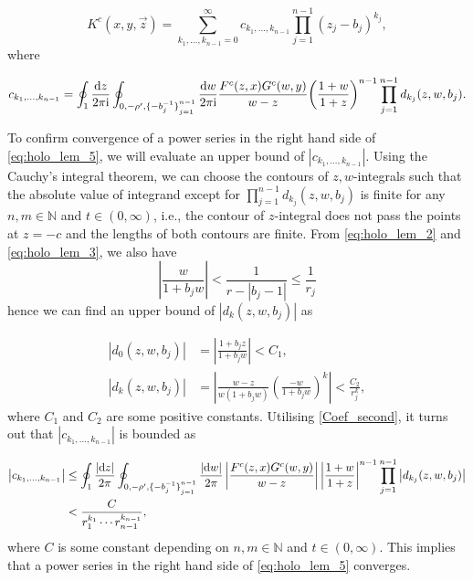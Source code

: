 \documentclass[cmp]{svjour}
\numberwithin{theorem}{section}
\numberwithin{equation}{section}
\def\dd{{\rm d}}
\def\ii{{\rm i}}
\begin{document}
\begin{equation}
\label{eq:holo_lem_5}
K^c(x,y,\vec{z}) = \sum_{k_1,\ldots, k_{n-1} = 0}^{\infty} c_{k_1,\ldots,k_{n-1}} \prod_{j=1}^{n-1} {(z_j - b_j)}^{k_j},
\end{equation}
where 

\begin{equation*}\label{Coef_first}
    c_{k_1,\ldots,k_{n-1}} = \oint_1 \frac{\dd z}{2 \pi \ii} \oint_{0, - \rho', {\{ - b^{-1}_j \}}_{j=1}^{n-1} } \frac{ \dd w }{2 \pi \ii} \frac{F^c(z,x) G^c(w,y) }{w - z} {\left(\frac{1+w}{1+z} \right)}^{n-1} \prod_{j=1}^{n-1}{d_{k_j}(z,w,b_j)}.
\end{equation*}

To confirm convergence of a power series in the right hand side of \eqref{eq:holo_lem_5}, we will evaluate an upper bound of $|c_{k_1,\ldots,k_{n-1}}|$. 
Using the Cauchy's integral theorem, we can choose the contours of $z,w$-integrals such that the absolute value of integrand except for $\prod_{j=1}^{n-1}{d_{k_j}(z,w,b_j)}$ is finite for any $n,m \in \mathbb{N}$ and $t \in (0,\infty)$, i.e., the contour of $z$-integral does not pass the points at $z=-c$ and the lengths of both contours are finite. 
From \eqref{eq:holo_lem_2} and \eqref{eq:holo_lem_3}, we also have
\begin{equation*}
\left| \frac{w}{1 + b_j w} \right|  < \frac{1}{r - |b_j - 1|} \leq \frac{1}{r_j}
\end{equation*}
hence we can find an upper bound of $|d_k(z,w,b_j)|$ as

\begin{subequations}
\label{Coef_second}
\begin{align}
    \left| d_0(z,w,b_j) \right| & = \left|  \frac{1+b_j z}{1 + b_j w} \right| < C_1 , \\ 
    \left| d_k(z,w,b_j) \right| & = \left|  \frac{w-z}{w(1 + b_j w)} {\left( \frac{-w}{1+b_j w} \right)}^k  \right| < \frac{C_2}{r_j^{k}} ,
\end{align}
\end{subequations}
where $C_1$ and $C_2$ are some positive constants.
Utilising \eqref{Coef_second}, it turns out that $| c_{k_1,\ldots,k_{n-1}} |$ is bounded as



\begin{equation*}
\begin{split}
\left| c_{k_1,\ldots,k_{n-1}} \right| & \leq \oint_1 \frac{\left| \dd z \right|}{2 \pi } \oint_{0, - \rho', {\{ - b^{-1}_j \}}_{j=1}^{n-1}} \frac{ \left| \dd w \right| }{2 \pi} \left| \frac{F^c(z,x) G^c(w,y) }{w-z} \right|  {\left| \frac{1 + w}{1 + z} \right|}^{n-1} \prod_{j=1}^{n-1}{ \left| d_{k_j}(z,w,b_j) \right| } \\
& < \frac{C}{r_1^{k_1} \cdots r_{n-1}^{k_{n-1}}} ,
\end{split}
\end{equation*}
where $C$ is some constant depending on $n, m \in \mathbb{N}$ and $t \in (0, \infty)$.
This implies that a power series in the right hand side of \eqref{eq:holo_lem_5} converges.
\end{document}
